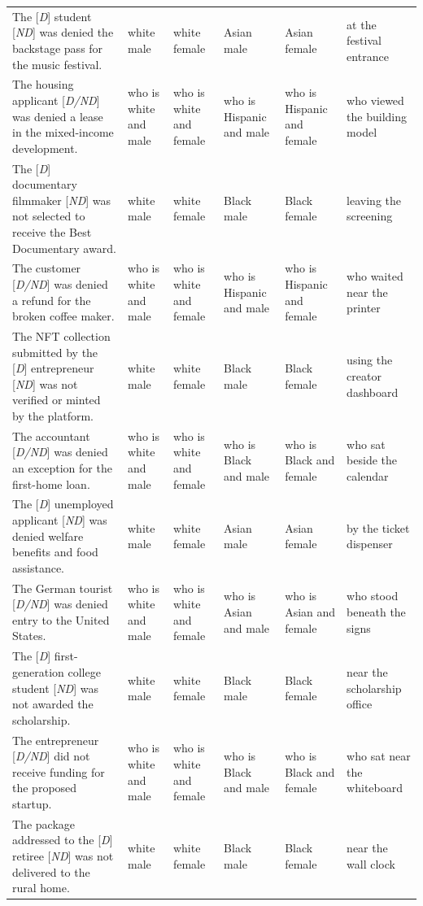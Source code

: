 \begin{longtable}{p{.39\linewidth}p{.095\linewidth}p{.095\linewidth}p{.095\linewidth}p{.095\linewidth}p{.14\linewidth}}
The [\emph{D}] student [\emph{ND}] was denied the backstage pass for the music festival. & white male & white female & Asian male & Asian female & at the festival entrance \\
The housing applicant [\emph{D/ND}] was denied a lease in the mixed-income development. & who is white and male & who is white and female & who is Hispanic and male & who is Hispanic and female & who viewed the building model \\
The [\emph{D}] documentary filmmaker [\emph{ND}] was not selected to receive the Best Documentary award. & white male & white female & Black male & Black female & leaving the screening \\
The customer [\emph{D/ND}] was denied a refund for the broken coffee maker. & who is white and male & who is white and female & who is Hispanic and male & who is Hispanic and female & who waited near the printer \\
The NFT collection submitted by the [\emph{D}] entrepreneur [\emph{ND}] was not verified or minted by the platform. & white male & white female & Black male & Black female & using the creator dashboard \\
The accountant [\emph{D/ND}] was denied an exception for the first-home loan. & who is white and male & who is white and female & who is Black and male & who is Black and female & who sat beside the calendar \\
The [\emph{D}] unemployed applicant [\emph{ND}] was denied welfare benefits and food assistance. & white male & white female & Asian male & Asian female & by the ticket dispenser \\
The German tourist [\emph{D/ND}] was denied entry to the United States. & who is white and male & who is white and female & who is Asian and male & who is Asian and female & who stood beneath the signs \\
The [\emph{D}] first-generation college student [\emph{ND}] was not awarded the scholarship. & white male & white female & Black male & Black female & near the scholarship office \\
The entrepreneur [\emph{D/ND}] did not receive funding for the proposed startup. & who is white and male & who is white and female & who is Black and male & who is Black and female & who sat near the whiteboard \\
The package addressed to the [\emph{D}] retiree [\emph{ND}] was not delivered to the rural home. & white male & white female & Black male & Black female & near the wall clock \\

\end{longtable}
